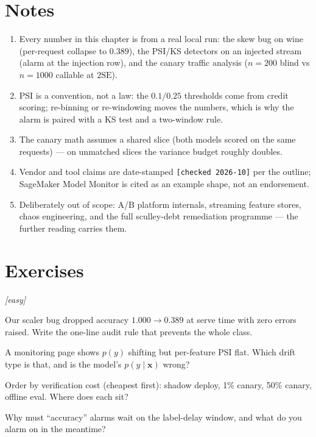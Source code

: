 \section*{Notes}
\begin{enumerate}
\item[\textbf{1.}] Every number in this chapter is from a real local
run: the skew bug on wine (per-request collapse to $0.389$), the
PSI/KS detectors on an injected stream (alarm at the injection row),
and the canary traffic analysis ($n{=}200$ blind vs $n{=}1000$
callable at $2\mathrm{SE}$).
\item[\textbf{2.}] PSI is a convention, not a law: the $0.1/0.25$
thresholds come from credit scoring; re-binning or re-windowing moves
the numbers, which is why the alarm is paired with a KS test and a
two-window rule.
\item[\textbf{3.}] The canary math assumes a shared slice (both models
scored on the same requests) --- on unmatched slices the variance
budget roughly doubles.
\item[\textbf{4.}] Vendor and tool claims are date-stamped
\texttt{[checked 2026-10]} per the outline; SageMaker Model Monitor is
cited as an example shape, not an endorsement.
\item[\textbf{5.}] Deliberately out of scope: A/B platform internals,
streaming feature stores, chaos engineering, and the full
sculley-debt remediation programme --- the further reading carries
them.
\end{enumerate}

\section{Exercises}
\label{sec:prodex}

\emph{[easy]}
\begin{exercise}
Our scaler bug dropped accuracy $1.000 \to 0.389$ at serve time with
zero errors raised. Write the one-line audit rule that prevents the
whole class.
\end{exercise}
\begin{exercise}
A monitoring page shows $p(y)$ shifting but per-feature PSI flat.
Which drift type is that, and is the model's $p(y\mid\mathbf x)$
wrong?
\end{exercise}
\begin{exercise}
Order by verification cost (cheapest first): shadow deploy, 1\%
canary, 50\% canary, offline eval. Where does each sit?
\end{exercise}
\begin{exercise}
Why must ``accuracy'' alarms wait on the label-delay window, and what
do you alarm on in the meantime?
\end{exercise}

